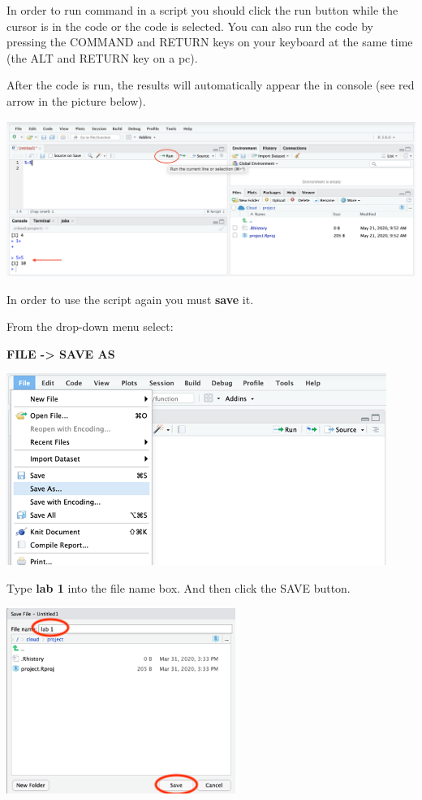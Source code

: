 \documentclass[
]{book}
\begin{document}
In order to run command in a script you should click the run button while the cursor is in the code or the code is selected. You can also run the code by pressing the COMMAND and RETURN keys on your keyboard at the same time (the ALT and RETURN key on a pc).

After the code is run, the results will automatically appear the in console (see red arrow in the picture below).

\includegraphics{img/script.png}

In order to use the script again you must \textbf{save} it.

From the drop-down menu select:

\textbf{FILE -\textgreater{} SAVE AS}

\includegraphics{img/savescript.png}

Type \textbf{lab 1} into the file name box. And then click the SAVE button.

\includegraphics{img/savescript2.png}
\end{document}
